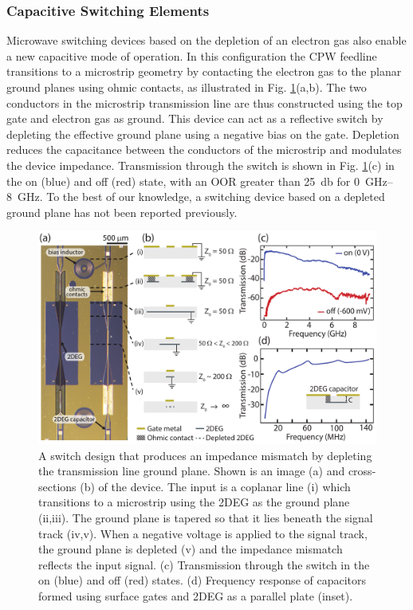 \subsubsection{Capacitive Switching Elements}
Microwave switching devices based on the depletion of an electron gas also enable a new capacitive mode of operation. In this configuration the CPW feedline transitions to a microstrip geometry by contacting the electron gas to the planar ground planes using ohmic contacts, as illustrated in Fig. \ref{fig:CAPswitch}(a,b). The two conductors in the microstrip transmission line are thus constructed using the top gate and electron gas as ground. This device can act as a reflective switch by depleting the effective ground plane using a negative bias on the gate. Depletion reduces the capacitance between the conductors of the microstrip and modulates the device impedance.
Transmission through the switch is shown in Fig. \ref{fig:CAPswitch}(c) in the on (blue) and off (red) state, with an OOR greater than \SI{25}{\decibel} for \SIrange{0}{8}{\giga\hertz}. To the best of our knowledge, a switching device based on a depleted ground plane has not been reported previously.

\begin{figure}
\centering
\includegraphics[width=0.7\linewidth]{Fig3_arch}
\caption[Schematic of a rf impedance matching switch]{\label{fig:CAPswitch}A switch design that produces an impedance mismatch by depleting the transmission line ground plane. Shown is an image (a) and cross-sections (b) of the device. The input is a coplanar line (i) which transitions to a microstrip using the 2DEG as the ground plane (ii,iii). The ground plane is tapered so that it lies beneath the signal track (iv,v). When a negative voltage is applied to the signal track, the ground plane is depleted (v) and the impedance mismatch reflects the input signal. (c) Transmission through the switch in the on (blue) and off (red) states. (d) Frequency response of capacitors formed using surface gates and 2DEG as a parallel plate (inset).}
\end{figure}

